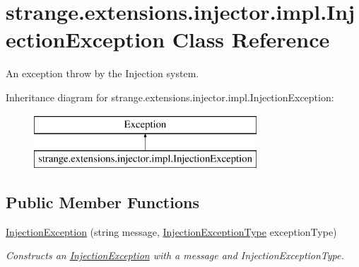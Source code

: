 \hypertarget{classstrange_1_1extensions_1_1injector_1_1impl_1_1_injection_exception}{\section{strange.\-extensions.\-injector.\-impl.\-Injection\-Exception Class Reference}
\label{classstrange_1_1extensions_1_1injector_1_1impl_1_1_injection_exception}
}


An exception throw by the Injection system.  


Inheritance diagram for strange.\-extensions.\-injector.\-impl.\-Injection\-Exception\-:\begin{figure}[H]
\begin{center}
\leavevmode
\includegraphics[height=2.000000cm]{classstrange_1_1extensions_1_1injector_1_1impl_1_1_injection_exception}
\end{center}
\end{figure}
\subsection*{Public Member Functions}
\begin{DoxyCompactItemize}
\item 
\hypertarget{classstrange_1_1extensions_1_1injector_1_1impl_1_1_injection_exception_a38355a2ef4b36ae9d01bf1c5cc321482}{\hyperlink{classstrange_1_1extensions_1_1injector_1_1impl_1_1_injection_exception_a38355a2ef4b36ae9d01bf1c5cc321482}{Injection\-Exception} (string message, \hyperlink{namespacestrange_1_1extensions_1_1injector_1_1api_a465caee64cba80e952ad7dd9a050e6c3}{Injection\-Exception\-Type} exception\-Type)}\label{classstrange_1_1extensions_1_1injector_1_1impl_1_1_injection_exception_a38355a2ef4b36ae9d01bf1c5cc321482}

\begin{DoxyCompactList}\small\item\em Constructs an \hyperlink{classstrange_1_1extensions_1_1injector_1_1impl_1_1_injection_exception}{Injection\-Exception} with a message and Injection\-Exception\-Type. \end{DoxyCompactList}\end{DoxyCompactItemize}
